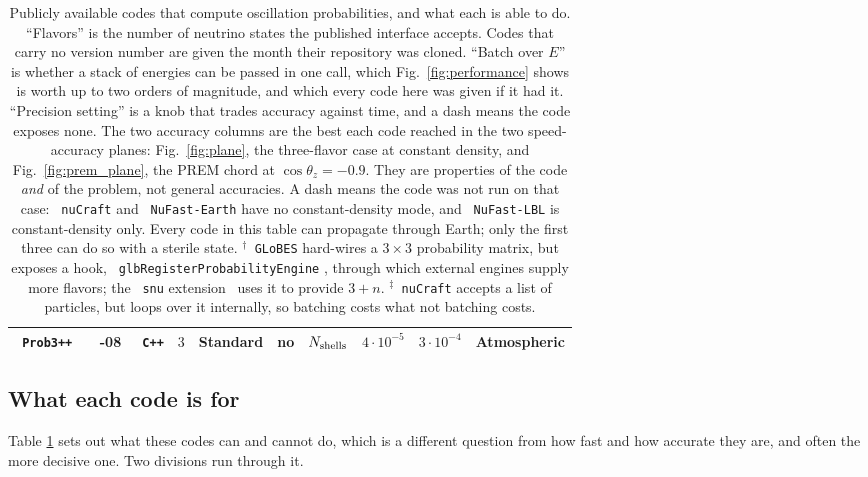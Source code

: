 \documentclass[final,5p,times,twocolumn]{elsarticle}
\newcommand{\fig}{Fig.}
\newcommand{\figu}[1]{\fig~\ref{fig:#1}}
\providecommand{\DIFaddtex}[1]{{\protect\color{blue} \sf #1}} %
\providecommand{\DIFaddFL}[1]{\DIFadd{#1}} %
\providecommand{\DIFadd}[1]{\DIFaddtex{#1}} %
\begin{document}
{\begin{table}[t!]
\begin{tabular}{l c c c p{1.75cm} c c c c p{1.85cm}}
 {\tt \DIFaddFL{Prob3++}}\DIFaddFL{\ }\cite{Prob3pp}
   & \DIFaddFL{2026-08 }& {\tt \DIFaddFL{C++}} & \DIFaddFL{$3$ }& \DIFaddFL{Standard }& \DIFaddFL{no }& \DIFaddFL{$N_{\rm shells}$
   }& \DIFaddFL{$4 \cdot 10^{-5}$ }& \DIFaddFL{$3 \cdot 10^{-4}$ }& \DIFaddFL{Atmospheric }\\
 \hline\hline
\end{tabular}
\caption{\label{tab:codes}\DIFaddFL{Publicly available codes that compute oscillation probabilities, and what each is able to do.  ``Flavors'' is the number of neutrino states the published interface accepts.  Codes that carry no version number are given the month their repository was cloned.  ``Batch over $E$'' is whether a stack of energies can be passed in one call, which \figu{performance} shows is worth up to two orders of magnitude, and which every code here was given if it had it.  ``Precision setting'' is a knob that trades accuracy against time, and a dash means the code exposes none.  The two accuracy columns are the best each code reached in the two speed-accuracy planes: \figu{plane}, the three-flavor case at constant density, and \figu{prem_plane}, the PREM chord at $\cos\theta_z = -0.9$.  They are properties of the code }\emph{\DIFaddFL{and}} \DIFaddFL{of the problem, not general accuracies.  A dash means the code was not run on that case: }{\tt \DIFaddFL{nuCraft}} \DIFaddFL{and }{\tt \DIFaddFL{NuFast-Earth}} \DIFaddFL{have no constant-density mode, and }{\tt \DIFaddFL{NuFast-LBL}} \DIFaddFL{is constant-density only.  Every code in this table can propagate through Earth; only the first three can do so with a sterile state.  $^{\dagger}$}{\tt \DIFaddFL{GLoBES}} \DIFaddFL{hard-wires a $3 \times 3$ probability matrix, but exposes a hook, }{\tt \DIFaddFL{glbRegisterProbabilityEngine}}\DIFaddFL{, through which external engines supply more flavors; the }{\tt \DIFaddFL{snu}} \DIFaddFL{extension\ }\cite{Kopp:2006wp} \DIFaddFL{uses it to provide $3+n$.  $^{\ddagger}$}{\tt \DIFaddFL{nuCraft}} \DIFaddFL{accepts a list of particles, but loops over it internally, so batching costs what not batching costs.}}
\end{table}
}

\subsection{\DIFadd{What each code is for}}
\label{section:capabilities}

\DIFadd{Table \ref{tab:codes} sets out what these codes can and cannot do, which is a different question from how fast and how accurate they are, and often the more decisive one.  Two divisions run through it.
}
\end{document}
